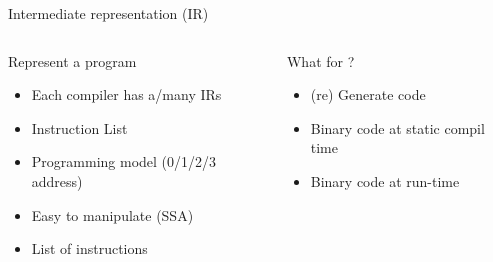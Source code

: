 %
\begin{Frame}{Intermediate representation (IR)}
  \begin{columns}[t]
    \begin{column}{\BW} %
      \begin{block}{Represent a program}
        \begin{itemize}
        \item Each compiler has a/many IRs
        \item Instruction List
        \item Programming model (0/1/2/3 address)
        \item Easy to manipulate (SSA)
        \item List of instructions
        \end{itemize}
      \end{block} 
    \end{column}
    
    \begin{column}{\BW} %
      \begin{block}{What for ?}
        \begin{itemize}
        \item (re) Generate code
        \item Binary code at static compil time
        \item Binary code at run-time
        \end{itemize}
      \end{block}   
    \end{column}
  \end{columns}  
\end{Frame}


